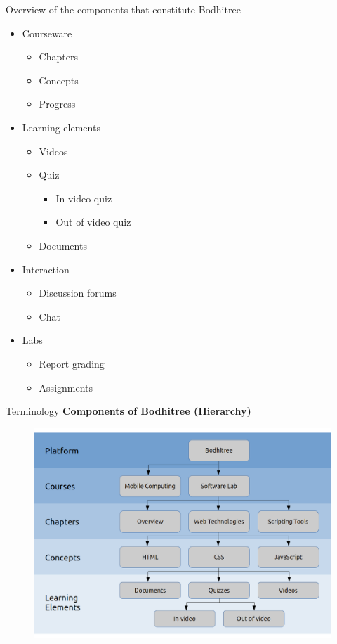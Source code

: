 \documentclass[xcolor=table]{beamer}
\begin{document}
\begin{frame}{Overview of the components that constitute Bodhitree}
  	\begin{itemize}
  		\item Courseware
  		\begin{itemize}
  			\item Chapters
  			\item Concepts
  			\item Progress
  		\end{itemize}
		\item Learning elements
		\begin{itemize}
  			\item Videos
	 		\item Quiz
	 		\begin{itemize}
	 			\item In-video quiz
	 			\item Out of video quiz
	 		\end{itemize}
	 		\item Documents			
		\end{itemize}	
  		\item Interaction
  		\begin{itemize}
  			\item Discussion forums
  			\item Chat
  		\end{itemize}
  		\item Labs
  		\begin{itemize}
	  		\item Report grading
	  		\item Assignments
  		\end{itemize}
  	\end{itemize}
\end{frame}

\begin{frame}{Terminology}
	\textbf{Components of Bodhitree (Hierarchy)}\vspace{-0.1in}
	\begin{figure}
	\centering
	\includegraphics[width=0.8\linewidth]{./media/bt_com1}
	\label{fig:bt}
	\end{figure}
\end{frame}
\end{document}
